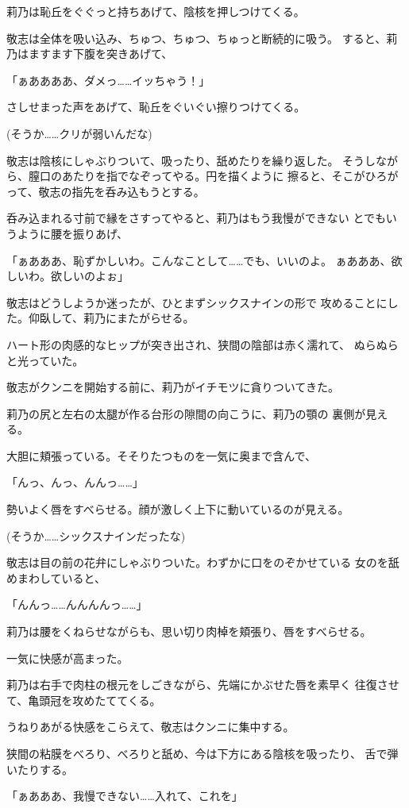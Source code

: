 ﻿\documentclass[
    book,tate,
    line_length=30zw,
    jafontsize=12pt,
    paper=b5j,
    landscape,
    ]{jlreq}
\begin{document}
莉乃は恥丘をぐぐっと持ちあげて、陰核を押しつけてくる。

敬志は全体を吸い込み、ちゅつ、ちゅつ、ちゅっと断続的に吸う。
すると、莉乃はますます下腹を突きあげて、

「ぁああああ、ダメっ……イッちゃう！」

さしせまった声をあげて、恥丘をぐいぐい擦りつけてくる。

(そうか……クリが弱いんだな)

敬志は陰核にしゃぶりついて、吸ったり、舐めたりを繰り返した。
そうしながら、膣口のあたりを指でなぞってやる。円を描くように
擦ると、そこがひろがって、敬志の指先を呑み込もうとする。

呑み込まれる寸前で縁をさすってやると、莉乃はもう我慢ができない
とでもいうように腰を振りあげ、

「ぁあああ、恥ずかしいわ。こんなことして……でも、いいのよ。
ぁあああ、欲しいわ。欲しいのよぉ」

敬志はどうしようか迷ったが、ひとまずシックスナインの形で
攻めることにした。仰臥して、莉乃にまたがらせる。

ハート形の肉感的なヒップが突き出され、狭間の陰部は赤く濡れて、
ぬらぬらと光っていた。

敬志がクンニを開始する前に、莉乃がイチモツに貪りついてきた。

莉乃の尻と左右の太腿が作る台形の隙間の向こうに、莉乃の顎の
裏側が見える。

大胆に頬張っている。そそりたつものを一気に奥まで含んで、

「んっ、んっ、んんっ……」

勢いよく唇をすべらせる。顔が激しく上下に動いているのが見える。

(そうか……シックスナインだったな)

敬志は目の前の花弁にしゃぶりついた。わずかに口をのぞかせている
女のを舐めまわしていると、

「んんっ……んんんんっ……」

莉乃は腰をくねらせながらも、思い切り肉棹を頬張り、唇をすべらせる。

一気に快感が高まった。

莉乃は右手で肉柱の根元をしごきながら、先端にかぶせた唇を素早く
往復させて、亀頭冠を攻めたててくる。

うねりあがる快感をこらえて、敬志はクンニに集中する。

狭間の粘膜をべろり、べろりと舐め、今は下方にある陰核を吸ったり、
舌で弾いたりする。

「ぁあああ、我慢できない……入れて、これを」
\end{document}
